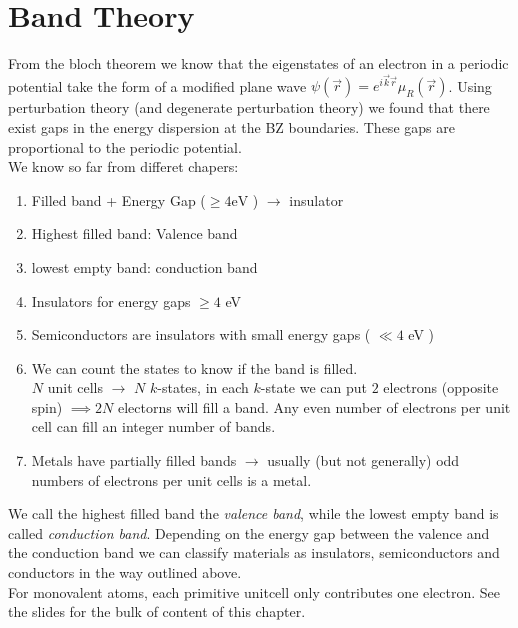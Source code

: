 \documentclass{report}
\begin{document}
\chapter{Band Theory}
From the bloch theorem we know that the eigenstates of an electron in a periodic potential take the form of a modified plane wave $\psi(\vec{r}) = e^{i\vec{k}\vec{r}} \mu_R(\vec{r})$. Using perturbation theory (and degenerate perturbation theory) we found that there exist gaps in the energy dispersion at the BZ boundaries. These gaps are proportional to the periodic potential.\\
We know so far from differet chapers:
\begin{enumerate}
	\item Filled band + Energy Gap ($\ge 4 \text{eV}$ ) $\to $ insulator
	\item Highest filled band: Valence band
	\item lowest empty band: conduction band
	\item Insulators for energy gaps $\ge 4$ eV
	\item Semiconductors are insulators with small energy gaps ( $\ll 4$ eV )
	\item We can count the states to know if the band is filled.\\
		$N$ unit cells $\to $ $N$ $k$-states, in each $k$-state we can put $2$ electrons (opposite spin) $\implies 2N$ electorns will fill a band. Any even number of electrons per unit cell can fill an integer number of bands.
	\item Metals have partially filled bands $\to$ usually (but not generally) odd numbers of electrons per unit cells is a metal.
\end{enumerate}
We call the highest filled band the \emph{valence band}, while the lowest empty band is called \emph{conduction band}. Depending on the energy gap between the valence and the conduction band we can classify materials as insulators, semiconductors and conductors in the way outlined above.\\
For monovalent atoms, each primitive unitcell only contributes one electron. See the slides for the bulk of content of this chapter.
\end{document}
